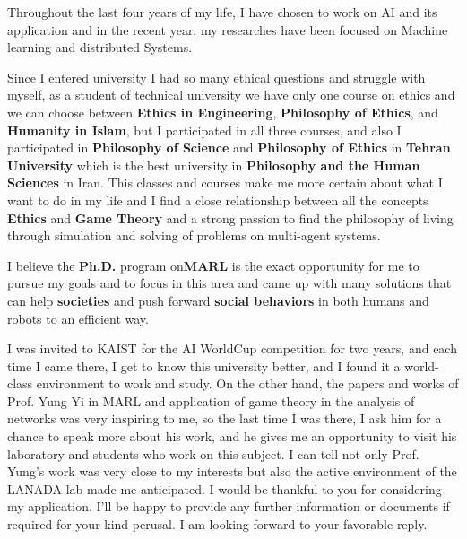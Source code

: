 \documentclass[11pt, a4paper]{awesome-cv}
\begin{document}
\begin{cvletter}
Throughout the last four years of my life, I have chosen to work on AI and its application and in the recent year, my researches have been focused on Machine learning and distributed Systems. 

Since I entered university I had so many ethical questions and struggle with myself, as a student of technical university we have only one course on ethics and we can choose between \textbf{Ethics in Engineering}, \textbf{Philosophy of Ethics}, and \textbf{Humanity in Islam}, but I participated in all three courses, and also I participated in \textbf{Philosophy of Science} and \textbf{Philosophy of Ethics} in \textbf{Tehran University} which is the best university in \textbf{Philosophy and the Human Sciences} in Iran. This classes and courses make me more certain about what I want to do in my life and I find a close relationship between all the concepts \textbf{Ethics} and \textbf{Game Theory} and a strong passion to find the philosophy of living through simulation and solving of problems on multi-agent systems.

I believe the \textbf{Ph.D.} program on\textbf{MARL} is the exact opportunity for me to pursue my goals and to focus in this area and came up with many solutions that can help \textbf{societies} and push forward \textbf{social behaviors} in both humans and robots to an efficient way.

I was invited to KAIST for the AI WorldCup competition for two years, and each time I came there, I get to know this university better, and I found it a world-class environment to work and study. On the other hand, the papers and works of Prof. Yung Yi in MARL and application of game theory in the analysis of networks was very inspiring to me, so the last time I was there, I ask him for a chance to speak more about his work, and he gives me an opportunity to visit his laboratory and students who work on this subject.
I can tell not only Prof. Yung's work was very close to my interests but also the active environment of the LANADA lab made me anticipated.
\newline
\newline
\newline
\newline
I would be thankful to you for considering my application. I’ll be happy to provide any further information or documents if required for your kind perusal.
I am looking forward to your favorable reply.
\end{cvletter}

\makeletterclosing
\end{document}

